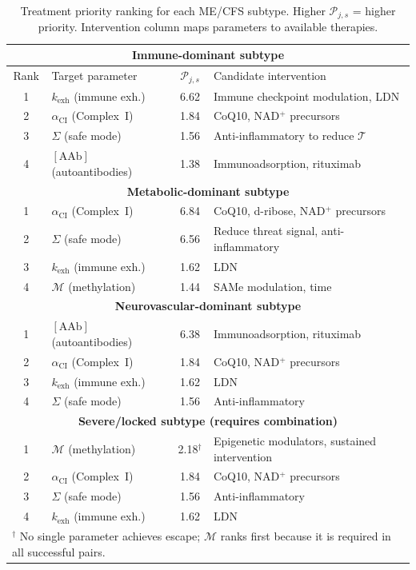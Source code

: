 \begin{table}[htbp]
\centering
\caption{Treatment priority ranking for each ME/CFS subtype. Higher $\mathcal{P}_{j,s}$ = higher priority. Intervention column maps parameters to available therapies.}
\label{tab:treatment-priority}
\begin{tabular}{clcl}
\hline
\multicolumn{4}{c}{\textbf{Immune-dominant subtype}} \\
\hline
Rank & Target parameter & $\mathcal{P}_{j,s}$ & Candidate intervention \\
\hline
1 & $k_{\text{exh}}$ (immune exh.) & 6.62 & Immune checkpoint modulation, LDN \\
2 & $\alpha_{\text{CI}}$ (Complex~I) & 1.84 & CoQ10, NAD$^+$ precursors \\
3 & $\Sigma$ (safe mode) & 1.56 & Anti-inflammatory to reduce $\mathcal{T}$ \\
4 & $[\text{AAb}]$ (autoantibodies) & 1.38 & Immunoadsorption, rituximab \\
\hline
\multicolumn{4}{c}{\textbf{Metabolic-dominant subtype}} \\
\hline
1 & $\alpha_{\text{CI}}$ (Complex~I) & 6.84 & CoQ10, d-ribose, NAD$^+$ precursors \\
2 & $\Sigma$ (safe mode) & 6.56 & Reduce threat signal, anti-inflammatory \\
3 & $k_{\text{exh}}$ (immune exh.) & 1.62 & LDN \\
4 & $\mathcal{M}$ (methylation) & 1.44 & SAMe modulation, time \\
\hline
\multicolumn{4}{c}{\textbf{Neurovascular-dominant subtype}} \\
\hline
1 & $[\text{AAb}]$ (autoantibodies) & 6.38 & Immunoadsorption, rituximab \\
2 & $\alpha_{\text{CI}}$ (Complex~I) & 1.84 & CoQ10, NAD$^+$ precursors \\
3 & $k_{\text{exh}}$ (immune exh.) & 1.62 & LDN \\
4 & $\Sigma$ (safe mode) & 1.56 & Anti-inflammatory \\
\hline
\multicolumn{4}{c}{\textbf{Severe/locked subtype (requires combination)}} \\
\hline
1 & $\mathcal{M}$ (methylation) & 2.18$^\dagger$ & Epigenetic modulators, sustained intervention \\
2 & $\alpha_{\text{CI}}$ (Complex~I) & 1.84 & CoQ10, NAD$^+$ precursors \\
3 & $\Sigma$ (safe mode) & 1.56 & Anti-inflammatory \\
4 & $k_{\text{exh}}$ (immune exh.) & 1.62 & LDN \\
\hline
\multicolumn{4}{l}{\small $^\dagger$ No single parameter achieves escape; $\mathcal{M}$ ranks first because it is required in all successful pairs.} \\
\end{tabular}
\end{table}


